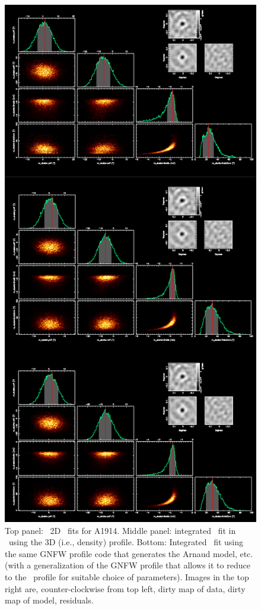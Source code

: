 \newpage
\begin{figure}[th]
\begin{center}
\includegraphics[scale=0.35]{figures/beta_model_comps.png}
\end{center}
\caption{Top panel: \climax\ 2D \betamodel\ fits for A1914.  Middle
  panel: integrated \betamodel\ fit in \climax\ using the 3D (i.e.,
  density) profile.  Bottom: Integrated \betamodel\ fit using the same
  GNFW profile code that generates the Arnaud model, etc. (with a
  generalization of the GNFW profile that allows it to reduce to the
  \betamodel\ profile for suitable choice of parameters). Images in
  the top right are, counter-clockwise from top left, dirty map of
  data, dirty map of model, residuals.}
\label{fig:fig2}
\end{figure}

